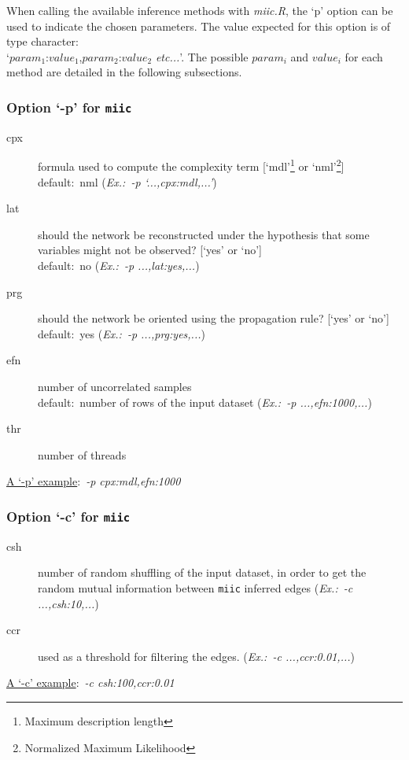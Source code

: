 \documentclass[12pt]{article}
\begin{document}
When calling the available inference methods with \emph{miic.R}, the `p' option can be used to indicate the chosen parameters. The value expected for this option is of type character:\\ `$param_{1}$:$value_{1}$,$param_{2}$:$value_{2}$ \textit{etc...}'. The possible $param_{i}$ and $value_{i}$ for each method are detailed in the following subsections.

\subsubsection*{Option `-p' for {\tt\bfseries miic}}

\begin{description}
	\item[cpx] formula used to compute the complexity term [`mdl'\footnote{Maximum description length} or `nml'\footnote{Normalized Maximum Likelihood}]\\default:~nml (\textit{\small{Ex.:~-p `...,cpx:mdl,...'}})
	\item[lat] should the network be reconstructed under the hypothesis that some variables might not be observed? 
	[`yes' or `no'] \\default:~no (\textit{\small{Ex.:~-p ...,lat:yes,...}})	
	\item[prg] should the network be oriented using the propagation rule? 
	[`yes' or `no'] \\default:~yes (\textit{\small{Ex.:~-p ...,prg:yes,...}})
	
	
	\item[efn] number of uncorrelated samples\\default:~number of rows of the input dataset (\textit{\small{Ex.:~-p ...,efn:1000,...}})
	\item[thr] number of threads
	 
\end{description}

\underline{A `-p' example}:~\textit{\small{-p cpx:mdl,efn:1000}}


\subsubsection*{Option `-c' for {\tt\bfseries miic}}\label{sssec:optionC}
\begin{description}
	\item[csh] number of random shuffling of the input dataset, in order to get the random mutual information between {\tt miic} inferred edges  		(\textit{\small{Ex.:~-c ...,csh:10,...}})
	\item[ccr] {\color{black}{confidence ratio}} used as a threshold for filtering the edges. (\textit{\small{Ex.:~-c ...,ccr:0.01,...}})
\end{description}
\underline{A `-c' example}:~\textit{\small{-c csh:100,ccr:0.01}}
\end{document}
